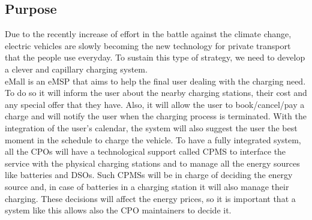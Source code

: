 


\subsection{Purpose}
Due to the recently increase of effort in the battle against the climate change, electric vehicles are slowly becoming the new technology for private transport that the people use everyday.
To sustain this type of strategy, we need to develop a clever and capillary charging system.\\
\ac{eMall} is an \ac{eMSP} that aims to help the final user dealing with the charging need.
To do so it will inform the user about the nearby charging stations, their cost and any special offer that they have.
Also, it will allow the user to book/cancel/pay a charge and will notify the user when the charging process is terminated.
With the integration of the user's calendar, the system will also suggest the user the best moment in the schedule to charge the vehicle.
To have a fully integrated system, all the \acp{CPO} will have a technological support called \ac{CPMS} to interface the service with the physical charging stations and to manage all the energy sources like batteries and \acp{DSO}.
Such \acp{CPMS} will be in charge of deciding the energy source and, in case of batteries in a charging station it will also manage their charging.
These decisions will affect the energy prices, so it is important that a system like this allows also the \ac{CPO} maintainers to decide it.
